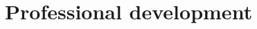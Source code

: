 \documentclass[letterpaper]{deedy-resume} %
\begin{document}




  





  
  



\vspace{0.2cm}
\section{Professional development}
\vspace{0.2cm}
\end{document}
